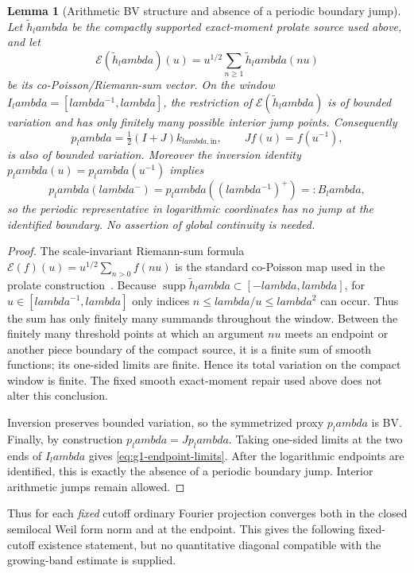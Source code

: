 \documentclass[11pt]{article}
\def\lambda{lambda}%
\newtheorem{lemma}[theorem]{Lemma}
\theoremstyle{remark}
\begin{document}
\begin{lemma}[Arithmetic BV structure and absence of a periodic boundary jump]\label{lem:g1-bv-structure}
Let $\widetilde h_\lambda$ be the compactly supported exact-moment prolate source used above, and let
\[
 \mathcal E(\widetilde h_\lambda)(u)
 =u^{1/2}\sum_{n\ge1}\widetilde h_\lambda(nu)
\]
be its co-Poisson/Riemann-sum vector.  On the window
$I_\lambda=[\lambda^{-1},\lambda]$, the restriction of
$\mathcal E(\widetilde h_\lambda)$ is of bounded variation and has only finitely many possible interior jump points.  Consequently
\[
 p_\lambda=\tfrac12(I+J)k_{\lambda,\mathrm{in}},
 \qquad Jf(u)=f(u^{-1}),
\]
is also of bounded variation.  Moreover the inversion identity
$p_\lambda(u)=p_\lambda(u^{-1})$ implies
\begin{equation}\label{eq:g1-endpoint-limits}
 p_\lambda(\lambda^-)=p_\lambda((\lambda^{-1})^+)=:B_\lambda,
\end{equation}
so the periodic representative in logarithmic coordinates has no jump at the identified boundary.  No assertion of global continuity is needed.
\end{lemma}
\begin{proof}
The scale-invariant Riemann-sum formula
$\mathcal E(f)(u)=u^{1/2}\sum_{n>0}f(nu)$ is the standard co-Poisson map used in the prolate construction~\cite{ConnesConsani2023}.  Because
$\operatorname{supp}\widetilde h_\lambda\subset[-\lambda,\lambda]$, for
$u\in[\lambda^{-1},\lambda]$ only indices
$n\le\lambda/u\le\lambda^2$ can occur.  Thus the sum has only finitely many summands throughout the window.  Between the finitely many threshold points at which an argument $nu$ meets an endpoint or another piece boundary of the compact source, it is a finite sum of smooth functions; its one-sided limits are finite.  Hence its total variation on the compact window is finite.  The fixed smooth exact-moment repair used above does not alter this conclusion.

Inversion preserves bounded variation, so the symmetrized proxy $p_\lambda$ is BV.  Finally, by construction $p_\lambda=Jp_\lambda$.  Taking one-sided limits at the two ends of $I_\lambda$ gives \eqref{eq:g1-endpoint-limits}.  After the logarithmic endpoints are identified, this is exactly the absence of a periodic boundary jump.  Interior arithmetic jumps remain allowed.
\end{proof}

Thus for each \emph{fixed} cutoff ordinary Fourier projection converges both in the closed semilocal Weil form norm and at the endpoint.  This gives the following fixed-cutoff existence statement, but no quantitative diagonal compatible with the growing-band estimate is supplied.
\end{document}
